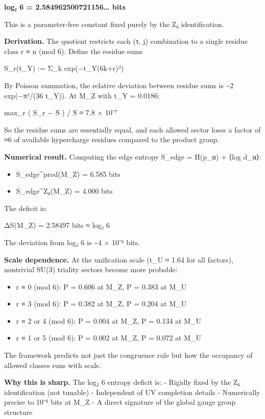 \documentclass[
]{article}
\providecommand{\tightlist}{%
  \setlength{\itemsep}{0pt}\setlength{\parskip}{0pt}}
\begin{document}
\textbf{log₂ 6 = 2.584962500721156\ldots{} bits}

This is a parameter-free constant fixed purely by the Z₆ identification.

\textbf{Derivation.} The quotient restricts each (τ, j) combination to a
single residue class r ≡ n (mod 6). Define the residue sums

S\_r(t\_Y) := Σ\_k exp(−t\_Y(6k+r)²)

By Poisson summation, the relative deviation between residue sums is
\textasciitilde2 exp(−π²/(36 t\_Y)). At M\_Z with t\_Y = 0.0186:

max\_r \textbar( S\_r − S̄ ) / S̄\textbar{} ≈ 7.8 × 10⁻⁷

So the residue sums are essentially equal, and each allowed sector loses
a factor of ≈6 of available hypercharge residues compared to the product
group.

\textbf{Numerical result.} Computing the edge entropy S\_edge = H(p\_α)
+ ⟨log d\_α⟩:

\begin{itemize}
\tightlist
\item
  S\_edge\^{}prod(M\_Z) = 6.585 bits
\item
  S\_edge\^{}Z₆(M\_Z) = 4.000 bits
\end{itemize}

The deficit is:

ΔS(M\_Z) = 2.58497 bits ≈ log₂ 6

The deviation from log₂ 6 is \textasciitilde4 × 10⁻⁶ bits.

\textbf{Scale dependence.} At the unification scale (t\_U ≈ 1.64 for all
factors), nontrivial SU(3) triality sectors become more probable:

\begin{itemize}
\tightlist
\item
  r ≡ 0 (mod 6): P = 0.606 at M\_Z, P = 0.383 at M\_U
\item
  r ≡ 3 (mod 6): P = 0.382 at M\_Z, P = 0.204 at M\_U
\item
  r ≡ 2 or 4 (mod 6): P = 0.004 at M\_Z, P = 0.134 at M\_U
\item
  r ≡ 1 or 5 (mod 6): P = 0.002 at M\_Z, P = 0.072 at M\_U
\end{itemize}

The framework predicts not just the congruence rule but how the
occupancy of allowed classes runs with scale.

\textbf{Why this is sharp.} The log₂ 6 entropy deficit is: - Rigidly
fixed by the Z₆ identification (not tunable) - Independent of UV
completion details - Numerically precise to 10⁻⁶ bits at M\_Z - A direct
signature of the global gauge group structure
\end{document}
